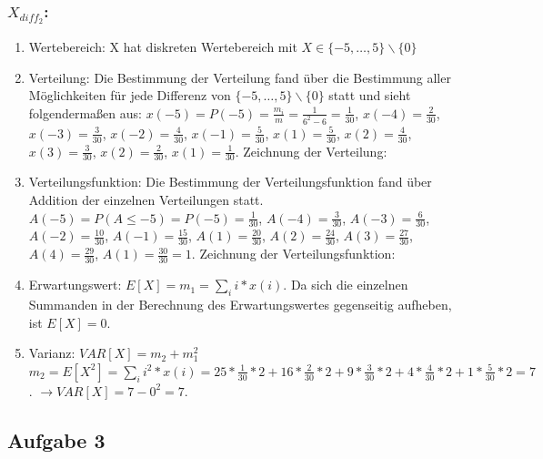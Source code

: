 \documentclass[%
10pt,              %
ngerman,           %
a4paper,           %
DIV11,             %
]{scrartcl}%
\begin{document}
\subsubsection*{$X_{diff_2}$:}

\begin{enumerate}
	\item Wertebereich: X hat diskreten Wertebereich mit $X \in \{-5, \dots, 5 \} \backslash \{0\}$
	\item Verteilung: Die Bestimmung der Verteilung fand über die Bestimmung aller Möglichkeiten für jede Differenz von $\{-5, \dots, 5 \} \backslash \{0\}$ statt und sieht folgendermaßen aus:\newline
	$x(-5) = P(-5) = \frac{m_i}{m} = \frac{1}{6^2 - 6} = \frac{1}{30}$,\newline
	$x(-4) = \frac{2}{30}$, $x(-3) = \frac{3}{30}$, $x(-2) = \frac{4}{30}$, $x(-1) = \frac{5}{30}$, $x(1) = \frac{5}{30}$, $x(2) = \frac{4}{30}$, $x(3) = \frac{3}{30}$, $x(2) = \frac{2}{30}$, $x(1) = \frac{1}{30}$. Zeichnung der Verteilung: 
	
	\item Verteilungsfunktion: Die Bestimmung der Verteilungsfunktion fand über Addition der einzelnen Verteilungen statt.\newline
	$A(-5) = P(A \leq -5) = P(-5) = \frac{1}{30}$,\newline
	$A(-4) = \frac{3}{30}$, $A(-3) = \frac{6}{30}$, $A(-2) = \frac{10}{30}$, $A(-1) = \frac{15}{30}$, $A(1) = \frac{20}{30}$, $A(2) = \frac{24}{30}$, $A(3) = \frac{27}{30}$, $A(4) = \frac{29}{30}$, $A(1) = \frac{30}{30} = 1$. Zeichnung der Verteilungsfunktion: 
	
	\item Erwartungswert: $E[X] = m_1 = \sum_{i} i * x(i)$. Da sich die einzelnen Summanden in der Berechnung des Erwartungswertes gegenseitig aufheben, ist $E[X] = 0$.
	\item Varianz: $VAR[X] = m_2 + m_1^2$\newline
	$m_2 = E[X^2] = \sum_{i} i^2 * x(i) = 25 * \frac{1}{30} * 2 + 16 * \frac{2}{30} * 2 + 9 * \frac{3}{30} * 2 + 4 * \frac{4}{30} * 2 + 1 * \frac{5}{30} * 2 = 7$.\newline
	$\rightarrow VAR[X] = 7 - 0^2 = 7$.
\end{enumerate}

\subsection*{Aufgabe 3}
\end{document}
